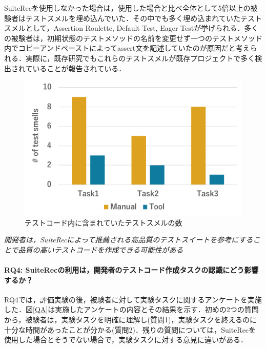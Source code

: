 \documentclass[12pt]{jarticle} %
\begin{document}
{\sf SuiteRec}を使用しなかった場合は，使用した場合と比べ全体として5倍以上の被験者はテストスメルを埋め込んでいた．その中でも多く埋め込まれていたテストスメルとして，Assertion Roulette, Default Test, Eager Testが挙げられる．多くの被験者は，初期状態のテストメソッドの名前を変更せず一つのテストメソッド内でコピーアンドペーストによってassert文を記述していたのが原因だと考えられる．実際に，既存研究でもこれらのテストスメルが既存プロジェクトで多く検出されていることが報告されている\cite{Peruma}．

\begin{figure}[htbp]
  \begin{center}
   \includegraphics[width=12cm]{smells.pdf}
  \caption{テストコード内に含まれていたテストスメルの数}
  \label{smell}
  \end{center}
\end{figure}

\vspace{\baselineskip}

\begin{breakbox}
\textit{開発者は，{\sf SuiteRec}によって推薦される高品質のテストスイートを参考にすることで品質の高いテストコードを作成できる可能性がある}
\end{breakbox}

\paragraph{RQ4: {\sf SuiteRec}の利用は，開発者のテストコード作成タスクの認識にどう影響するか？}

RQ4では，評価実験の後，被験者に対して実験タスクに関するアンケートを実施した．図\ref{QA}は実施したアンケートの内容とその結果を示す．初めの2つの質問から，被験者は，実験タスクを明確に理解し(質問1)，実験タスクを終えるのに十分な時間があったことが分かる(質問2)．残りの質問については，{\sf SuiteRec}を使用した場合とそうでない場合で，実験タスクに対する意見に違いがある．
\end{document}
